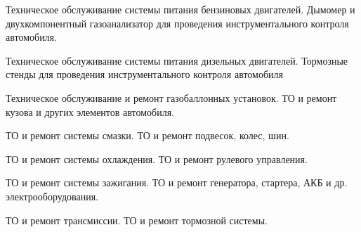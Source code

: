 \documentclass[
	14pt,
	a4paper,
	]
	{scrartcl}
\begin{document}
\shapk
{}
\setcounter{zad}{0}

\vfill
\z Техническое обслуживание системы питания бензиновых двигателей.
 \vfill
\z Дымомер и двухкомпонентный газоанализатор для проведения инструментального контроля автомобиля. 
 \vfill

\vfill

\newpage


\shapk
{}
\setcounter{zad}{0}

\vfill
\z Техническое обслуживание системы питания дизельных двигателей.
 \vfill
\z Тормозные стенды для проведения инструментального контроля автомобиля 
 \vfill

\vfill

\newpage


\shapk
{}
\setcounter{zad}{0}

\vfill
\z Техническое обслуживание и ремонт газобаллонных установок.
 \vfill
\z  ТО и ремонт кузова и других элементов автомобиля. 
 \vfill

\vfill

\newpage


\shapk
{}
\setcounter{zad}{0}

\vfill
\z ТО и ремонт системы смазки.
 \vfill
\z ТО и ремонт подвесок, колес, шин.
 \vfill

\vfill

\newpage


\shapk
{}
\setcounter{zad}{0}

\vfill
\z ТО и ремонт системы охлаждения. 
 \vfill
\z ТО и ремонт рулевого управления. 
 \vfill

\vfill

\newpage


\shapk
{}
\setcounter{zad}{0}

\vfill
\z ТО и ремонт системы зажигания. 
 \vfill
\z ТО и ремонт генератора, стартера, АКБ и др. электрооборудования. 
 \vfill

\vfill

\newpage


\shapk
{}
\setcounter{zad}{0}

\vfill
\z ТО и ремонт трансмиссии. 
 \vfill
\z ТО и ремонт тормозной системы. 
 \vfill

\vfill

\newpage
\end{document}

